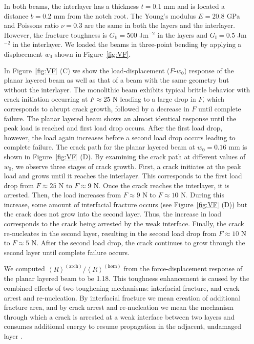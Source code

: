 \documentclass[12pt,onecolumn]{article}
\begin{document}
In both beams, the interlayer has a thickness $t = 0.1$ mm and is located a distance $b = 0.2$ mm from the notch root. The Young's modulus $E = 20.8$ GPa and Poissons ratio $\nu = 0.3$ are the same in both the layers and the interlayer. However, the fracture toughness is $G_\mathrm{b} = 500$ Jm$^{-2}$ in the layers and $G_\mathrm{I} = 0.5$ Jm$^{-2}$ in the interlayer. We loaded the beams in three-point bending by applying a displacement $w_0$ shown in Figure~\ref{fig:VF}. 

In Figure~\ref{fig:VF} (C) we show the load-displacement ($F$-$w_0$) response of the planar layered beam as well as that of a beam with the same geometry but without the interlayer. The monolithic beam exhibits typical brittle behavior with crack initiation occurring at $F\approx25$ N leading to a large drop in $F$, which corresponds to abrupt crack growth, followed by a decrease in $F$ until complete failure. The planar layered beam shows an almost identical response until the peak load is reached and first load drop occurs. After the first load drop, however, the load again increases before a second load drop occurs leading to complete failure. The crack path for the planar layered beam at $w_0 = 0.16$ mm is shown in Figure~\ref{fig:VF} (D). By examining the crack path at different values of $w_0$, we observe three stages of crack growth. First, a crack initiates at the peak load and grows until it reaches the interlayer. This corresponds to the first load drop from $F \approx 25$ N to $F \approx 9$ N. Once the crack reaches the interlayer, it is arrested. Then, the load increases from $F \approx 9$ N to $F \approx 10$ N. During this increase, some amount of interfacial fracture occurs (see Figure~\ref{fig:VF} (D)) but the crack does not grow into the second layer. Thus, the increase in load corresponds to the crack being arrested by the weak interface. Finally, the crack re-nucleates in the second layer, resulting in the second load drop from $F \approx 10$ N to $F \approx 5$ N. After the second load drop, the crack continues to grow through the second layer until complete failure occurs.


We computed $\left< R\right>^{(\mathrm{arch})}/\left< R\right>^{(\mathrm{hom})}$ from the force-displacement response of the planar layered beam to be 1.18. This toughness enhancement is caused by the combined effects of two toughening mechanisms: interfacial fracture, and crack arrest and re-nucleation. By interfacial fracture we mean creation of additional fracture area, and by crack arrest and re-nucleation we mean the mechanism through which a crack is arrested at a weak interface between two layers and consumes additional energy to resume propagation in the adjacent, undamaged layer \cite{cook1964mechanism,jackson1988mechanical,currey1977,kamat2000structural}.
\end{document}
